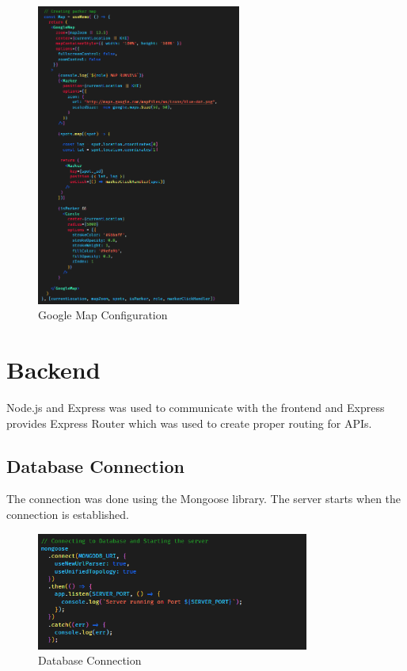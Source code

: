     \begin{figure}[h]
        \centering
        \includegraphics[width=0.6\textwidth]{images/googleMap.png}
        \caption{Google Map Configuration}
        \label{fig:googleMap}
    \end{figure}

    \pagebreak


    \section{Backend}

    Node.js and Express was used to communicate with the frontend and Express provides Express Router which was used to create proper routing for APIs.
        
    \subsection{Database Connection}
    The connection was done using the Mongoose library. The server starts when the connection is established.
        \begin{figure}[h]
            \centering
            \includegraphics[width=0.8\textwidth]{images/dbConnection.png}
            \caption{Database Connection}
            \label{fig:dbConnection}
        \end{figure}

